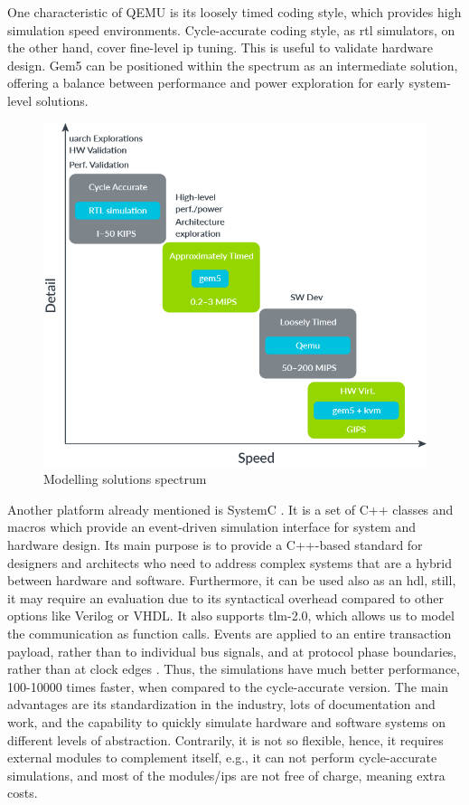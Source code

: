 One characteristic of QEMU is its loosely timed coding style, which provides high simulation speed environments. Cycle-accurate coding style, as \gls{rtl} simulators, on the other hand, cover fine-level \gls{ip} tuning. This is useful to validate hardware design. Gem5 can be positioned within the spectrum as an intermediate solution, offering a balance between performance and power exploration for early system-level solutions.

\begin{figure}[H]
	\centering
 	\includegraphics[width=0.6\linewidth]{Images/SimulationComparation.png}
 	\caption{ Modelling solutions spectrum \cite{herrera2020running}}
	 \label{fig_gem5VSQEMU}
\end{figure}

Another platform already mentioned is SystemC \cite{systemC}. It is a set of C++ classes and macros which provide an event-driven simulation interface for system and hardware design. Its main purpose is to provide a C++-based standard for designers and architects who need to address complex systems that are a hybrid between hardware and software. Furthermore, it can be used also as an \gls{hdl}, still, it may require an evaluation due to its syntactical overhead compared to other options like Verilog or VHDL. It also supports \gls{tlm}-2.0, which allows us to model the communication as function calls. Events are applied to an entire transaction payload, rather than to individual bus signals, and at protocol phase
boundaries, rather than at clock edges \cite{wieman2012overview}. Thus, the simulations have much better performance, 100-10000 times faster, when compared to the cycle-accurate version. The main advantages are its standardization in the industry, lots of documentation and work, and the capability to quickly simulate hardware and software systems on different levels of abstraction. Contrarily, it is not so flexible, hence, it requires external modules to complement itself, e.g., it can not perform cycle-accurate simulations, and most of the modules/\glspl{ip} are not free of charge, meaning extra costs. 


